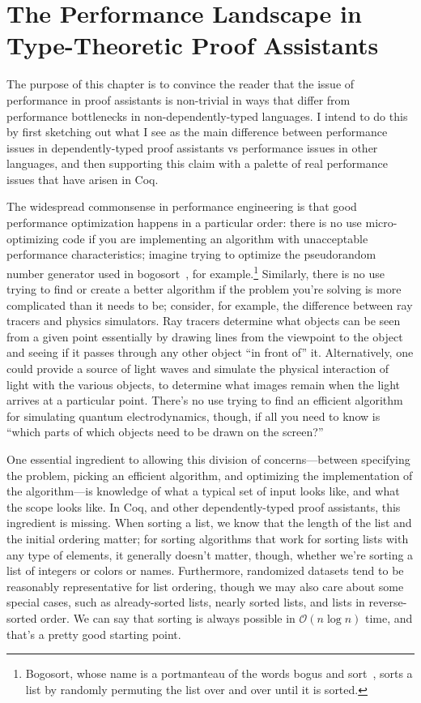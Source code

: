 \chapter{The Performance Landscape in Type-Theoretic Proof Assistants} \label{ch:perf-failures}

The purpose of this chapter is to convince the reader that the issue of performance in proof assistants is non-trivial in ways that differ from performance bottlenecks in non-dependently-typed languages.
I intend to do this by first sketching out what I see as the main difference between performance issues in dependently-typed proof assistants vs performance issues in other languages, and then supporting this claim with a palette of real performance issues that have arisen in Coq.

The widespread commonsense in performance engineering\cite{commonsense-perf-engineering-order-of-operations} is that good performance optimization happens in a particular order:
there is no use micro-optimizing code if you are implementing an algorithm with unacceptable performance characteristics; imagine trying to optimize the pseudorandom number generator used in bogosort~\cite{bogosort}, for example.\footnote{Bogosort, whose name is a portmanteau of the words bogus and sort~\cite{bogosort-name}, sorts a list by randomly permuting the list over and over until it is sorted.}
Similarly, there is no use trying to find or create a better algorithm if the problem you're solving is more complicated than it needs to be; consider, for example, the difference between ray tracers and physics simulators.
Ray tracers determine what objects can be seen from a given point essentially by drawing lines from the viewpoint to the object and seeing if it passes through any other object ``in front of'' it.
Alternatively, one could provide a source of light waves and simulate the physical interaction of light with the various objects, to determine what images remain when the light arrives at a particular point.
There's no use trying to find an efficient algorithm for simulating quantum electrodynamics, though, if all you need to know is ``which parts of which objects need to be drawn on the screen?''

One essential ingredient to allowing this division of concerns---between specifying the problem, picking an efficient algorithm, and optimizing the implementation of the algorithm---is knowledge of what a typical set of input looks like, and what the scope looks like.
In Coq, and other dependently-typed proof assistants, this ingredient is missing.
When sorting a list, we know that the length of the list and the initial ordering matter; for sorting algorithms that work for sorting lists with any type of elements, it generally doesn't matter, though, whether we're sorting a list of integers or colors or names.
Furthermore, randomized datasets tend to be reasonably representative for list ordering, though we may also care about some special cases, such as already-sorted lists, nearly sorted lists, and lists in reverse-sorted order.
We can say that sorting is always possible in $\mathcal O(n\log n)$ time, and that's a pretty good starting point.


